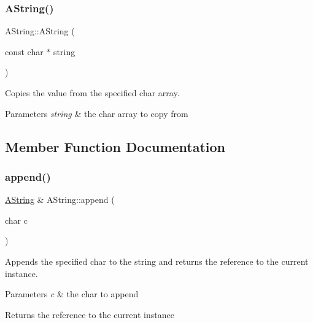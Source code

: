 \subsubsection{\texorpdfstring{AString()}{AString()}\hspace{0.1cm}{\footnotesize\ttfamily [3/3]}}
{\footnotesize\ttfamily A\+String\+::\+A\+String (\begin{DoxyParamCaption}\item[{const char $\ast$}]{string }\end{DoxyParamCaption})}



Copies the value from the specified char array. 


\begin{DoxyParams}{Parameters}
{\em string} & the char array to copy from \\
\hline
\end{DoxyParams}


\subsection{Member Function Documentation}
\mbox{\label{class_a_string_a7f87ec8aea6fbd0605ac5b987e8d2d6e}} 
\subsubsection{\texorpdfstring{append()}{append()}\hspace{0.1cm}{\footnotesize\ttfamily [1/2]}}
{\footnotesize\ttfamily \mbox{\hyperlink{class_a_string}{A\+String}} \& A\+String\+::append (\begin{DoxyParamCaption}\item[{char}]{c }\end{DoxyParamCaption})}



Appends the specified char to the string and returns the reference to the current instance. 


\begin{DoxyParams}{Parameters}
{\em c} & the char to append \\
\hline
\end{DoxyParams}
\begin{DoxyReturn}{Returns}
the reference to the current instance 
\end{DoxyReturn}
\mbox{\label{class_a_string_aeac95119d8284d146b4b59ba773a351a}} 
